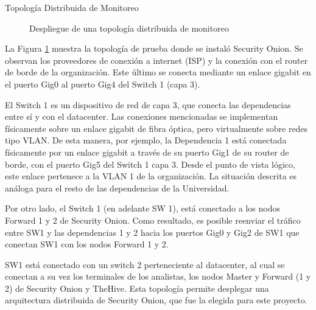\begin{subsection}{Topología Distribuida de Monitoreo}
\begin{figure}[H]
                \caption{Despliegue de una topología distribuida de monitoreo}
                \label{fig:iter1_top_d_unc}
            \end{figure}
            La Figura \ref{fig:iter1_top_d_unc} muestra la topología de prueba donde se instaló Security Onion. Se observan los proveedores de conexión a internet (ISP) y la conexión con el router de borde de la organización. Este último se conecta mediante un enlace gigabit en el puerto Gig0 al puerto Gig4 del Switch 1 (capa 3). \par
            El Switch 1 es un dispositivo de red de capa 3, que conecta las dependencias entre sí y con el datacenter. Las conexiones mencionadas se implementan físicamente sobre un enlace gigabit de fibra óptica, pero virtualmente sobre redes tipo VLAN. De esta manera, por ejemplo, la Dependencia 1 está conectada físicamente por un enlace gigabit a través de su puerto Gig1 de su router de borde, con el puerto Gig5 del Switch 1 capa 3. Desde el punto de vista lógico, este enlace pertenece a la VLAN 1 de la organización. La situación descrita es análoga para el resto de las dependencias de la Universidad. \par
            Por otro lado, el Switch 1 (en adelante SW 1), está conectado a los nodos Forward 1 y 2 de Security Onion. Como resultado, es posible reenviar el tráfico entre SW1 y las dependencias 1 y 2 hacia los puertos Gig0 y Gig2 de SW1 que conectan SW1 con los nodos Forward 1 y 2. \par
            SW1 está conectado con un switch 2 perteneciente al datacenter, al cual se conectan a su vez los terminales de los analistas, los nodos Master y Forward (1 y 2) de Security Onion y TheHive. Esta topología permite desplegar una arquitectura distribuida de Security Onion, que fue la elegida para este proyecto.
        \end{subsection}
